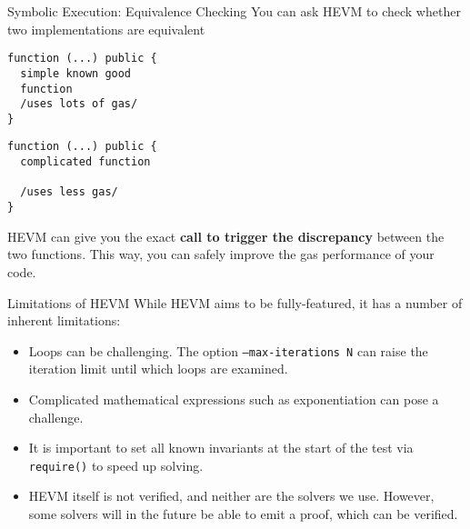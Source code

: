 \documentclass{beamer}
\begin{document}
\begin{frame}[fragile=singleslide]{Symbolic Execution: Equivalence Checking}
You can ask HEVM to check whether two implementations are equivalent
\bigskip
\\

\begin{minipage}[b]{0.45\textwidth}
\begin{Verbatim}[frame=single, framerule=0.2mm, framesep=2mm,fontsize=\small]
function (...) public {
  simple known good
  function
  /uses lots of gas/
}
    \end{Verbatim}
  \end{minipage}
  \begin{minipage}[b]{0.45\textwidth}
  \begin{Verbatim}[frame=single, framerule=0.2mm, framesep=2mm,fontsize=\small]
function (...) public {
  complicated function
  
  /uses less gas/
}
\end{Verbatim}
\end{minipage}

HEVM can give you the exact \textbf{call to trigger the discrepancy} between the two functions. This way, you can safely improve the gas performance of your code.
\end{frame}




\begin{frame}[fragile=singleslide]{Limitations of HEVM}
While HEVM aims to be fully-featured, it has a number of inherent limitations:

\begin{itemize}
\item Loops can be challenging. The option \texttt{--max-iterations N} can raise the iteration limit until which loops are examined.
\item Complicated mathematical expressions such as exponentiation can pose a challenge.
\item It is important to set all known invariants at the start of the test via \texttt{require()} to speed up solving.
\item HEVM itself is not verified, and neither are the solvers we use. However, some solvers will in the future be able to emit a proof, which can be verified.
\end{itemize}
\end{frame}
\end{document}
